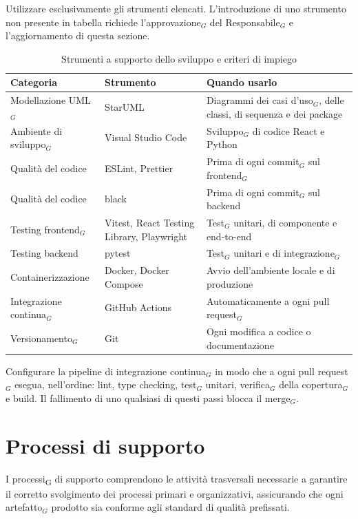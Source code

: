 \documentclass[a4paper, 10pt]{article}
\renewcommand{\arraystretch}{1.2}
\begin{document}
Utilizzare esclusivamente gli strumenti elencati. L'introduzione di uno strumento non presente in tabella richiede l'approvazione$_G$ del Responsabile$_G$ e l'aggiornamento di questa sezione.

\begin{table}[H]
    \centering
    \renewcommand{\arraystretch}{1.3}
    \begin{tabularx}{\textwidth}{|l|L|L|}
        \hline
        \textbf{Categoria} & \textbf{Strumento} & \textbf{Quando usarlo} \\
        \hline
        Modellazione UML$_G$ & StarUML & Diagrammi dei casi d'uso$_G$, delle classi, di sequenza e dei package \\ \hline
        Ambiente di sviluppo$_G$ & Visual Studio Code & Sviluppo$_G$ di codice React e Python \\ \hline
        Qualità del codice & ESLint, Prettier & Prima di ogni commit$_G$ sul frontend$_G$ \\ \hline
        Qualità del codice & black & Prima di ogni commit$_G$ sul backend \\ \hline
        Testing frontend$_G$ & Vitest, React Testing Library, Playwright & Test$_G$ unitari, di componente e end-to-end \\ \hline
        Testing backend & pytest & Test$_G$ unitari e di integrazione$_G$ \\ \hline
        Containerizzazione & Docker, Docker Compose & Avvio dell'ambiente locale e di produzione \\ \hline
        Integrazione continua$_G$ & GitHub Actions & Automaticamente a ogni pull request$_G$ \\ \hline
        Versionamento$_G$ & Git & Ogni modifica a codice o documentazione \\ \hline
    \end{tabularx}
    \caption{Strumenti a supporto dello sviluppo e criteri di impiego}
\end{table}

\noindent Configurare la pipeline di integrazione continua$_G$ in modo che a ogni pull request$_G$ esegua, nell'ordine: lint, type checking, test$_G$ unitari, verifica$_G$ della copertura$_G$ e build. Il fallimento di uno qualsiasi di questi passi blocca il merge$_G$.

\section{Processi di supporto}
I processi\textsubscript{G} di supporto comprendono le attività trasversali necessarie a garantire il corretto svolgimento dei processi primari e organizzativi, assicurando che ogni artefatto$_G$ prodotto sia conforme agli standard di qualità prefissati.
\end{document}
